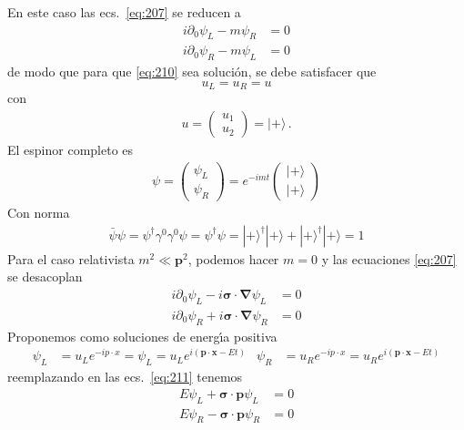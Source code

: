 En este caso las ecs.~\eqref{eq:207} se reducen a
\begin{align}
  i\partial_0\psi_L -m\psi_R &=0\nonumber\\
  i\partial_0\psi_R -m\psi_L &=0
\end{align}
de modo que para que \eqref{eq:210} sea soluci\'on, se debe satisfacer que 
\begin{equation}
  u_L=u_R=u
\end{equation}
con
\begin{align}
  u=  \begin{pmatrix}
    u_1\\
    u_2    
  \end{pmatrix}=|+\rangle\,.
\end{align}
El espinor completo es
\begin{align}
  \psi=\begin{pmatrix}
    \psi_L\\
    \psi_R
  \end{pmatrix}=e^{-i m t}\begin{pmatrix}
    |+\rangle\\
    |+\rangle
  \end{pmatrix}
\end{align}
Con norma
\begin{align}
  \bar{\psi}\psi=\psi^\dagger\gamma^0\gamma^0\psi=\psi^\dagger\psi=|+\rangle^\dagger|+\rangle+|+\rangle^\dagger|+\rangle=1
\end{align}
Para el caso relativista $m^2\ll\mathbf{p}^2$, podemos hacer $m=0$ y las ecuaciones \eqref{eq:207} se desacoplan
\begin{align}
  \label{eq:211}
   i\partial_0\psi_L-i\boldsymbol{\sigma}\cdot\boldsymbol{\nabla}\psi_L &=0\nonumber\\
   i\partial_0\psi_R+i\boldsymbol{\sigma}\cdot\boldsymbol{\nabla}\psi_R&=0
\end{align}
Proponemos como soluciones de energ\'\i a positiva
\begin{align}
  \label{eq:212}
    \psi_L&=u_L e^{-i p\cdot x}=\psi_L=u_L e^{i(\mathbf{p}\cdot \mathbf{x}-E t)} & \psi_R&=u_R e^{-i p\cdot x}=u_R e^{i(\mathbf{p}\cdot \mathbf{x}-E t)}
\end{align}
reemplazando en las ecs.~\eqref{eq:211} tenemos
\begin{align}
  \label{eq:217}
     E\psi_L+\boldsymbol{\sigma}\cdot\mathbf{p}\psi_L &=0\nonumber\\
   E\psi_R-\boldsymbol{\sigma}\cdot\mathbf{p}\psi_R&=0
\end{align}
